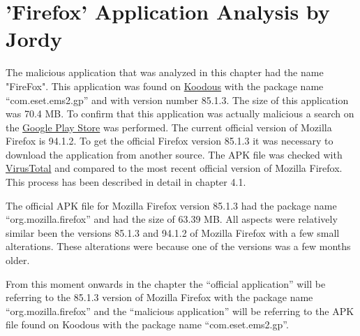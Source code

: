 \section{'Firefox' Application Analysis by Jordy}
The malicious application that was analyzed in this chapter had the name "FireFox".
This application was found on \href{https://koodous.com/apks/26a7576cc1182bf90fb16c3320d12a736b3faa10c158755605f36daae4b197b7}{Koodous} with the package name “com.eset.ems2.gp” and with version number 85.1.3.
The size of this application was 70.4 MB.
To confirm that this application was actually malicious a search on the \href{https://play.google.com/store/apps/details?id=org.mozilla.firefox&hl=nl&gl=US}{Google Play Store} was performed.
The current official version of Mozilla Firefox is 94.1.2.
To get the official Firefox version 85.1.3 it was necessary to download the application from another source.
The APK file was checked with \href{https://www.virustotal.com/gui/file/59ce0f9ea256b4576f391d01c685ced2db224a252bf09c3f362e6859a6c7ead5/details}{VirusTotal} and compared to the most recent official version of Mozilla Firefox.
This process has been described in detail in chapter 4.1.

The official APK file for Mozilla Firefox version 85.1.3 had the package name “org.mozilla.firefox” and had the size of 63.39 MB.
All aspects were relatively similar been the versions 85.1.3 and 94.1.2 of Mozilla Firefox with a few small alterations.
These alterations were because one of the versions was a few months older.

From this moment onwards in the chapter the “official application” will be referring to the 85.1.3 version of Mozilla Firefox with the package name “org.mozilla.firefox” and the “malicious application” will be referring to the APK file found on Koodous with the package name “com.eset.ems2.gp”.